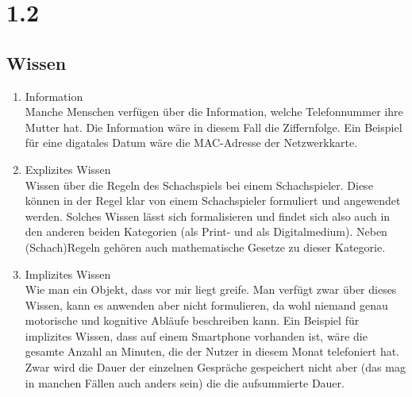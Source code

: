 \documentclass[a4paper,11pt,fleqn]{scrartcl}
\begin{document}
\section*{1.2}
\subsection*{Wissen}
\begin{enumerate}
	\item Information \\
	Manche Menschen verfügen über die Information, welche Telefonnummer ihre Mutter hat. Die Information wäre in diesem Fall die Ziffernfolge. Ein Beispiel für eine digatales Datum wäre die MAC-Adresse der Netzwerkkarte.        
	\item Explizites Wissen \\
	Wissen über die Regeln des Schachspiels bei einem Schachspieler. Diese können in der Regel klar von einem Schachspieler formuliert und angewendet werden. Solches Wissen lässt sich formalisieren und findet sich also auch in den anderen beiden Kategorien (als Print- und als Digitalmedium). Neben (Schach)Regeln gehören auch mathematische Gesetze zu dieser Kategorie.
	\item Implizites Wissen\\
	Wie man ein Objekt, dass vor mir liegt greife. Man verfügt zwar über dieses Wissen, kann es anwenden aber nicht formulieren, da wohl niemand genau motorische und kognitive Abläufe beschreiben kann. Ein Beispiel für implizites Wissen, dass auf einem Smartphone vorhanden ist, wäre die gesamte Anzahl an Minuten, die der Nutzer in diesem Monat telefoniert hat. Zwar wird die Dauer der einzelnen Gespräche gespeichert nicht aber (das mag in manchen Fällen auch anders sein) die die aufsummierte Dauer.          
\end{enumerate}
\end{document}
